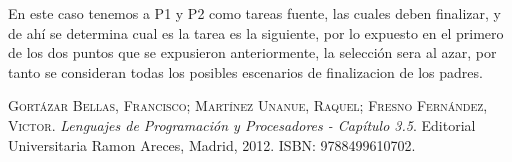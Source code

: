 \documentclass{article}
\begin{document}
En este caso tenemos a P1 y P2 como tareas fuente, las cuales deben finalizar, y de ah\'i se determina cual es la tarea es la siguiente, por lo expuesto en el primero de los dos puntos que se expusieron anteriormente, la selecci\'on sera al azar, por tanto se consideran todas los posibles escenarios de finalizacion de los padres.

\newpage
\begin{thebibliography}{99}
	\textsc{Gort\'azar Bellas, Francisco; Mart\'inez Unanue, Raquel; Fresno Fern\'andez, Victor}. \textit{Lenguajes de Programaci\'on y Procesadores - Cap\'itulo 3.5}. Editorial Universitaria Ramon Areces, Madrid, 2012. \textsc{ISBN: 9788499610702}.
\end{thebibliography}
\end{document}
